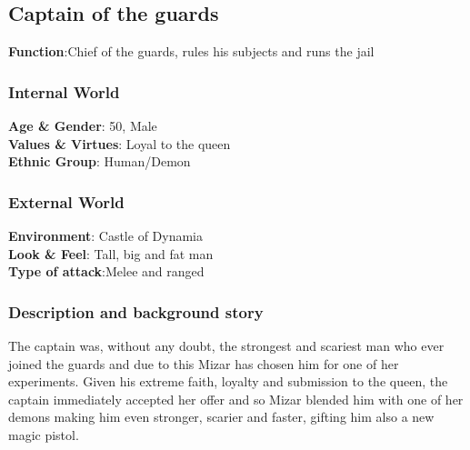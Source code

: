 \subsection{Captain of the guards}

\begin{minipage}{0.5\textwidth}
\textbf{Function}:Chief of the guards, rules his subjects and runs the jail

\subsubsection{Internal World}

\textbf{Age \& Gender}: 50, Male \\
\textbf{Values \& Virtues}: Loyal to the queen\\
\textbf{Ethnic Group}: Human/Demon

\subsubsection{External World}
\textbf{Environment}: Castle of Dynamia \\
\textbf{Look \& Feel}: Tall, big and fat man\\
\textbf{Type of attack}:Melee and ranged \\
\end{minipage}%
%
\hfill\begin{minipage}{0.4\textwidth}
\end{minipage}


\subsubsection{Description and background story}
The captain was, without any doubt, the strongest and scariest man who ever joined the guards and due to this Mizar has chosen him for one of her experiments. Given his extreme faith, loyalty and submission to the queen, the captain immediately accepted her offer and so Mizar blended him with one of her demons making him even stronger, scarier and faster, gifting him also a new magic pistol.

